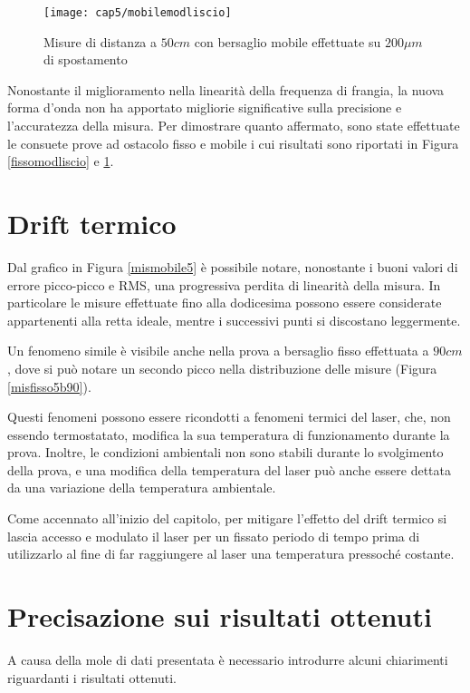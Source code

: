 \begin{figure}  
  \begin{center}
    \texttt{[image: cap5/mobilemodliscio]}
    \caption{Misure di distanza a $50cm$ con bersaglio mobile effettuate su $200 \mu m$ di spostamento}
    \label{mobilemodliscio}
  \end{center}
\end{figure}

Nonostante il miglioramento nella linearità della frequenza di frangia, la nuova forma d'onda non ha apportato migliorie significative sulla precisione e l'accuratezza della misura. Per dimostrare quanto affermato, sono state effettuate le consuete prove ad ostacolo fisso e mobile i cui risultati sono riportati in Figura \ref{fissomodliscio} e \ref{mobilemodliscio}.

\section{Drift termico}
Dal grafico in Figura \ref{mismobile5} è possibile notare, nonostante i buoni valori di errore picco-picco e RMS, una progressiva perdita di linearità della misura. In particolare le misure effettuate fino alla dodicesima possono essere considerate appartenenti alla retta ideale, mentre i successivi punti si discostano leggermente.

Un fenomeno simile è visibile anche nella prova a bersaglio fisso effettuata a $90cm$, dove si può notare un secondo picco nella distribuzione delle misure (Figura \ref{misfisso5b90}).

Questi fenomeni possono essere ricondotti a fenomeni termici del laser, che, non essendo termostatato, modifica la sua temperatura di funzionamento durante la prova. Inoltre, le condizioni ambientali non sono stabili durante lo svolgimento della prova, e una modifica della temperatura del laser può anche essere dettata da una variazione della temperatura ambientale.

Come accennato all'inizio del capitolo, per mitigare l'effetto del drift termico si lascia accesso e modulato il laser per un fissato periodo di tempo prima di utilizzarlo al fine di far raggiungere al laser una temperatura pressoché costante.

\section{Precisazione sui risultati ottenuti}
A causa della mole di dati presentata è necessario introdurre alcuni chiarimenti riguardanti i risultati ottenuti.


